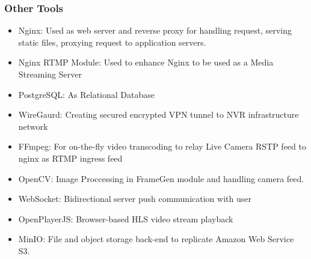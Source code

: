 \subsubsection*{Other Tools}
\begin{itemize}
	\item Nginx: Used as web server and reverse proxy for handling request, serving static files, proxying request to application servers.
	\item Nginx RTMP Module: Used to enhance Nginx to be used as a Media Streaming Server
	\item PostgreSQL: As Relational Database
	\item WireGaurd: Creating secured encrypted VPN tunnel to NVR infrastructure network
	\item FFmpeg: For on-the-fly video transcoding to relay Live Camera RSTP feed to nginx as RTMP ingress feed
	\item OpenCV: Image Proccessing in FrameGen module and handling camera feed.
	\item WebSocket: Bidirectional server push communication with user
	\item OpenPlayerJS: Browser-based HLS video stream playback
	\item MinIO: File and object storage back-end to replicate Amazon Web Service S3.
\end{itemize}


